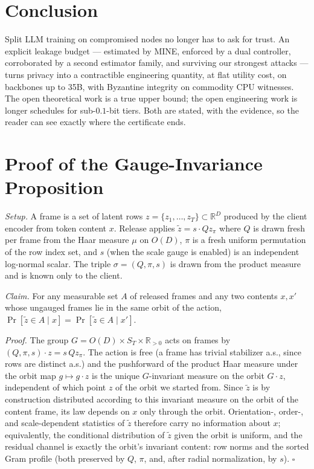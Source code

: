 \documentclass[10pt]{article}
\begin{document}
\section{Conclusion}
\label{sec:conclusion}

Split LLM training on compromised nodes no longer has to ask for trust.
An explicit leakage budget — estimated by MINE, enforced by a dual
controller, corroborated by a second estimator family, and surviving our
strongest attacks — turns privacy into a contractible engineering
quantity, at flat utility cost, on backbones up to 35B, with Byzantine
integrity on commodity CPU witnesses.  The open theoretical work is a
true upper bound; the open engineering work is longer schedules for
sub-$0.1$-bit tiers.  Both are stated, with the evidence, so the reader
can see exactly where the certificate ends.




\appendix

\section{Proof of the Gauge-Invariance Proposition}
\label{app:proof}

\emph{Setup.} A frame is a set of latent rows $z = \{z_1,\dots,z_T\}
\subset \mathbb{R}^D$ produced by the client encoder from token content
$x$.  Release applies $\tilde z = s \cdot Q z_{\pi}$ where $Q$ is drawn
fresh per frame from the Haar measure $\mu$ on $O(D)$, $\pi$ is a fresh
uniform permutation of the row index set, and $s$ (when the scale gauge
is enabled) is an independent log-normal scalar.  The triple
$\sigma = (Q, \pi, s)$ is drawn from the product measure and is known
only to the client.

\emph{Claim.} For any measurable set $A$ of released frames and any two
contents $x, x'$ whose ungauged frames lie in the same orbit of the
action,
$\Pr[\tilde z \in A \mid x] = \Pr[\tilde z \in A \mid x']$.

\emph{Proof.}  The group $G = O(D) \times S_T \times \mathbb{R}_{>0}$
acts on frames by $(Q,\pi,s) \cdot z = s\,Q z_\pi$.  The action is
free (a frame has trivial stabilizer a.s., since rows are distinct a.s.)
and the pushforward of the product Haar measure under the orbit map
$g \mapsto g \cdot z$ is the unique $G$-invariant measure on the orbit
$G \cdot z$, independent of which point $z$ of the orbit we started
from.  Since $\tilde z$ is by construction distributed according to this
invariant measure on the orbit of the content frame, its law depends on
$x$ only through the orbit.  Orientation-, order-, and scale-dependent
statistics of $\tilde z$ therefore carry no information about $x$;
equivalently, the conditional distribution of $\tilde z$ given the orbit
is uniform, and the residual channel is exactly the orbit's invariant
content: row norms and the sorted Gram profile (both preserved by $Q$,
$\pi$, and, after radial normalization, by $s$). \hfill$\square$
\end{document}
